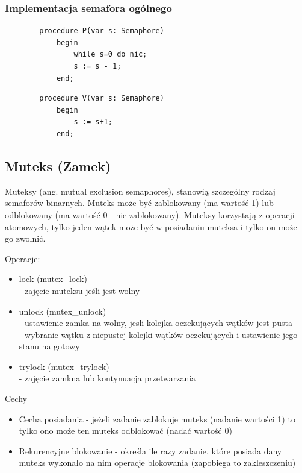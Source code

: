 \documentclass[12pt]{article}
\begin{document}
    \subsubsection{Implementacja semafora ogólnego}
    \begin{verbatim}
        procedure P(var s: Semaphore)
            begin
                while s=0 do nic;
                s := s - 1;
            end;
    \end{verbatim}
    
    \begin{verbatim}
        procedure V(var s: Semaphore)
            begin
                s := s+1;
            end;
    \end{verbatim}
    
    \subsection{Muteks (Zamek)}
    Muteksy (ang. mutual exclusion semaphores), stanowią szczególny rodzaj semaforów binarnych. Muteks może być zablokowany (ma wartość 1) lub odblokowany (ma wartość 0 - nie zablokowany). Muteksy korzystają z operacji atomowych, tylko jeden wątek może być w posiadaniu muteksa i tylko on może go zwolnić.
    
    Operacje:
    \begin{itemize}
        \item lock (mutex\_lock)\\ - zajęcie muteksu jeśli jest wolny
        \item unlock (mutex\_unlock) \\ - ustawienie zamka na wolny, jesli kolejka oczekujących wątków jest pusta\\
        - wybranie wątku z niepustej kolejki wątków oczekujących i ustawienie jego stanu na gotowy
        \item trylock (mutex\_trylock)\\ - zajęcie zamkna lub kontynuacja przetwarzania
    \end{itemize}
    
    Cechy
    \begin{itemize}
        \item Cecha posiadania - jeżeli zadanie zablokuje muteks (nadanie wartości 1) to tylko ono może ten muteks odblokować (nadać wartość 0)
        \item Rekurencyjne blokowanie - określa ile razy zadanie, które posiada dany muteks wykonało na nim operacje blokowania (zapobiega to zakleszczeniu)
    \end{itemize}
    
\end{document}
